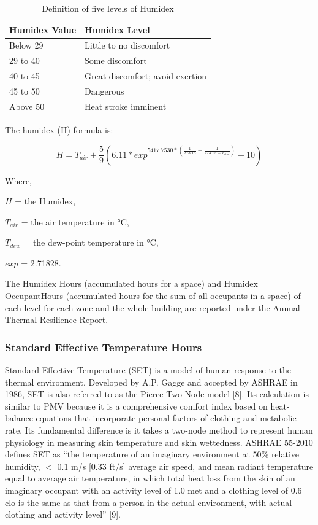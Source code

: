 \begin{table}
\centering
\caption{Definition of five levels of Humidex \protect \label{table:humidex-chart}} \tabularnewline
\begin{tabular}{ |p{1in}|p{3in}|  }
\hline
      \textbf{Humidex Value} & \textbf{Humidex Level} \\ \hline
      Below 29 & Little to no discomfort \\ \hline
      29 to 40 & Some discomfort \\ \hline
      40 to 45 & Great discomfort; avoid exertion \\ \hline
      45 to 50 & Dangerous \\ \hline
      Above 50 & Heat stroke imminent \\ \hline
\end{tabular}
\end{table}

The humidex (H) formula is:

\begin{equation}  \label{eq:rm-5}
H = T_{air} + \frac{5}{9}(6.11 * exp^{5417.7530 * (\frac{1}{273.16} - \frac{1}{273.15 + T_{dew}})} - 10)
\end{equation}

Where,

$H$ = the Humidex,

$T_{air}$ = the air temperature in \si{\celsius},

$T_{dew}$ = the dew-point temperature in \si{\celsius},

$exp$ = 2.71828.

The Humidex Hours (accumulated hours for a space) and Humidex OccupantHours
(accumulated hours for the sum of all occupants in a space) of each level for
each zone and the whole building are reported under the Annual Thermal
Resilience Report.

\subsubsection{Standard Effective Temperature Hours}\label{set-hour}
Standard Effective Temperature (SET) is a model of human response to the thermal
environment. Developed by A.P. Gagge and accepted by ASHRAE in 1986, SET is also
referred to as the Pierce Two-Node model [8]. Its calculation is similar to PMV
because it is a comprehensive comfort index based on heat-balance equations that
incorporate personal factors of clothing and metabolic rate. Its fundamental
difference is it takes a two-node method to represent human physiology in
measuring skin temperature and skin wettedness. ASHRAE 55-2010 defines SET as
``the temperature of an imaginary environment at 50\% relative humidity, $<$ 0.1
m/s [0.33 ft/s] average air speed, and mean radiant temperature equal to average
air temperature, in which total heat loss from the skin of an imaginary occupant
with an activity level of 1.0 met and a clothing level of 0.6 clo is the same as
that from a person in the actual environment, with actual clothing and activity
level'' [9].

